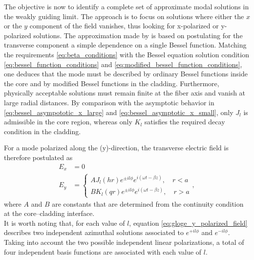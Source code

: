 The objective is now to identify a complete set of approximate modal solutions in the weakly guiding limit. The approach is to focus on solutions where either the $x$ or the $y$ component of the field vanishes, thus looking for x-polarized or y-polarized solutions. 
The approximation made by \citeauthor*{Gloge:71} \cite{Gloge:71} is based on postulating for the transverse component a simple dependence on a single Bessel function. Matching the requirements \eqref{eq:beta_conditions} with the Bessel equation solution condition \eqref{eq:bessel_function_conditions} and \eqref{eq:modified_bessel_function_conditions}, one deduces that the mode must be described by ordinary Bessel functions inside the core and by modified Bessel functions in the cladding.
Furthermore, physically acceptable solutions must remain finite at the fiber axis and vanish at large radial distances. By comparison with the asymptotic behavior in \eqref{eq:bessel_asympototic_x_large} and \eqref{eq:bessel_asymptotic_x_small}, only $J_l$ is admissible in the core region, whereas only $K_l$ satisfies the required decay condition in the cladding.

For a mode polarized along the (y)-direction, the transverse electric field is therefore postulated as
\begin{equation}
    \label{eq:gloge_y_polarized_field}
    \begin{aligned}
        E_x & = 0 \\
        E_y & =
        \begin{cases}
            AJ_l(hr)e^{\pm il\phi}e^{i(\omega t-\beta z)},\quad r<a \\[2.5mm]
            BK_l(qr)e^{\pm il\phi}e^{i(\omega t-\beta z)},\quad r>a
        \end{cases},
    \end{aligned}
\end{equation}
where $A$ and $B$ are constants that are determined from the continuity condition at the core--cladding interface.\\
It is worth noting that, for each value of $l$, equation \eqref{eq:gloge_y_polarized_field} describes two independent azimuthal solutions associated to $e^{+il\phi}$ and $e^{-il\phi}$. Taking into account the two possible independent linear polarizations, a total of four independent basis functions are associated with each value of $l$.

